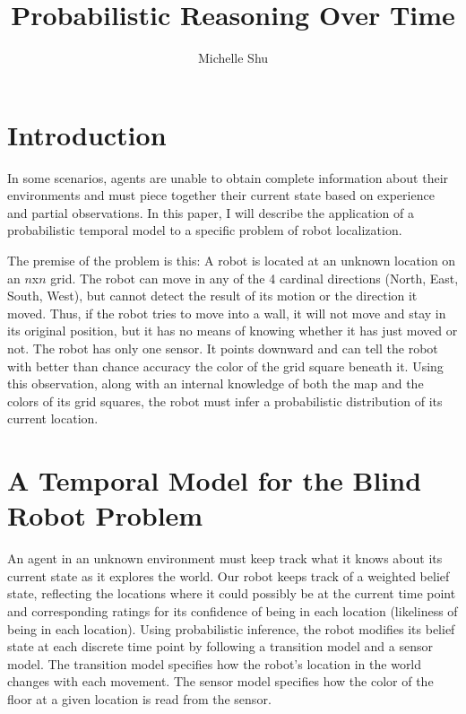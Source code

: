 \documentclass{article}
\title{Probabilistic Reasoning Over Time}
\author{Michelle Shu}
\begin{document}
\maketitle

\section{Introduction}

In some scenarios, agents are unable to obtain complete information about their environments and must piece together their current state based on experience and partial observations. In this paper, I will describe the application of a probabilistic temporal model to a specific problem of robot localization. 

\vspace{2mm}

The premise of the problem is this: A robot is located at an unknown location on an $n$x$n$ grid. The robot can move in any of the 4 cardinal directions (North, East, South, West), but cannot detect the result of its motion or the direction it moved. Thus, if the robot tries to move into a wall, it will not move and stay in its original position, but it has no means of knowing whether it has just moved or not. The robot has only one sensor. It points downward and can tell the robot with better than chance accuracy the color of the grid square beneath it. Using this observation, along with an internal knowledge of both the map and the colors of its grid squares, the robot must infer a probabilistic distribution of its current location.

\section{A Temporal Model for the Blind Robot Problem}

An agent in an unknown environment must keep track what it knows about its current state as it explores the world. Our robot keeps track of a weighted belief state, reflecting the locations where it could possibly be at the current time point and corresponding ratings for its confidence of being in each location (likeliness of being in each location). Using probabilistic inference, the robot modifies its belief state at each discrete time point by following a transition model and a sensor model. The transition model specifies how the robot's location in the world changes with each movement. The sensor model specifies how the color of the floor at a given location is read from the sensor.
\end{document}
